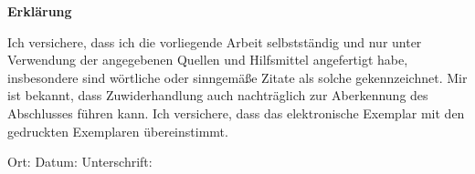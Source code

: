 \documentclass{mimosis}
\begin{document}
\frontmatter
  
  

  \tableofcontents

\mainmatter
  
  
  
  
  
  
  

\backmatter


  \printacronyms
  \printindex
  \printbibliography
  \cleardoublepage
  \listoffigures


\newpage
\thispagestyle{empty}
\begin{center}
	\vspace*{5em}
	\huge\textbf{Erklärung}\\
\end{center}
\vspace{2em}
Ich versichere, dass ich die vorliegende Arbeit selbstständig und nur unter Verwendung der angegebenen Quellen und Hilfsmittel angefertigt habe, insbesondere sind wörtliche oder sinngemäße Zitate als solche gekennzeichnet. Mir ist bekannt, dass Zuwiderhandlung auch nachträglich zur Aberkennung des Abschlusses führen kann. Ich versichere, dass das elektronische Exemplar mit den gedruckten Exemplaren übereinstimmt.

\vspace{4em}

Ort: \hspace{10em} Datum: \hspace{10em} Unterschrift: 
\end{document}

